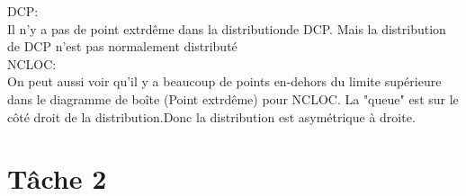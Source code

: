 \documentclass{article}
\begin{document}
{\begin{flushleft}
    DCP:\\
    Il n'y a pas de point extrdême dans la distributionde DCP. Mais la distribution de DCP n'est pas normalement distributé
    \\
    
    NCLOC:\\
    On peut aussi voir qu'il y a beaucoup de points en-dehors du limite supérieure dans le diagramme de boîte (Point extrdême) pour NCLOC. La "queue" est sur le côté droit de la distribution.Donc 
    la distribution est asymétrique à droite.\\
    \end{flushleft}
}




\section*{Tâche 2}
\end{document}
